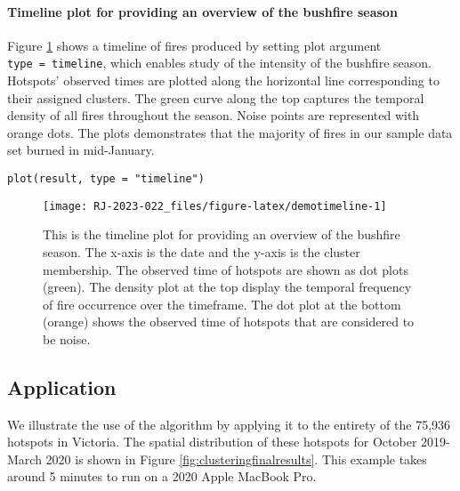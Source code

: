 \hypertarget{timeline-plot-for-providing-an-overview-of-the-bushfire-season}{%
\paragraph{Timeline plot for providing an overview of the bushfire season}\label{timeline-plot-for-providing-an-overview-of-the-bushfire-season}}

Figure \ref{fig:demotimeline} shows a timeline of fires produced by setting plot argument \texttt{type\ =\ \textquotesingle{}timeline\textquotesingle{}}, which enables study of the intensity of the bushfire season. Hotspots' observed times are plotted along the horizontal line corresponding to their assigned clusters. The green curve along the top captures the temporal density of all fires throughout the season. Noise points are represented with orange dots. The plots demonstrates that the majority of fires in our sample data set burned in mid-January.

\begin{verbatim}
plot(result, type = "timeline")
\end{verbatim}

\begin{figure}

{\centering \texttt{[image: RJ-2023-022\_files/figure-latex/demotimeline-1]} 

}

\caption{This is the timeline plot for providing an overview of the bushfire season. The x-axis is the date and the y-axis is the cluster membership. The observed time of hotspots are shown as dot plots (green). The density plot at the top display the temporal frequency of fire occurrence over the timeframe. The dot plot at the bottom (orange) shows the observed time of hotspots that are considered to be noise.}\label{fig:demotimeline}
\end{figure}

\hypertarget{application}{%
\subsection{Application}\label{application}}

We illustrate the use of the algorithm by applying it to the entirety of the 75,936 hotspots in Victoria. The spatial distribution of these hotspots for October 2019-March 2020 is shown in Figure \ref{fig:clusteringfinalresults}. This example takes around 5 minutes to run on a 2020 Apple MacBook Pro.

